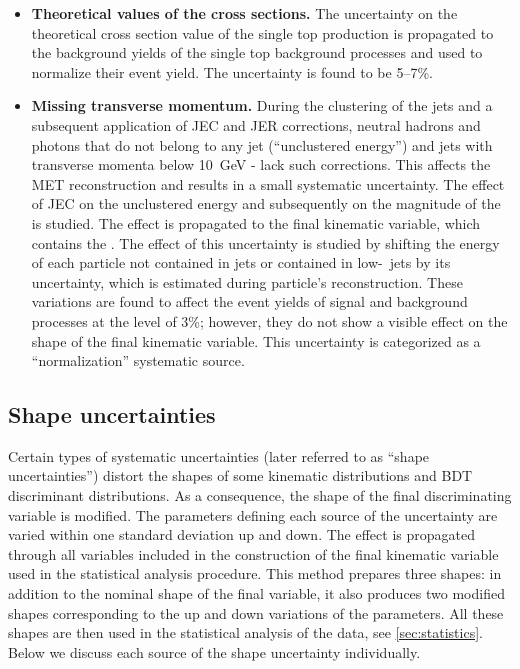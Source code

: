 \begin{itemize}
\item{\bf Theoretical values of the cross sections.} 
The uncertainty on the theoretical cross section value of the single top production is propagated to the background yields of the single top background processes and used to normalize their event yield. The uncertainty is found to be 5--7\%. 

\item{\bf Missing transverse momentum.} 
During the clustering of the jets and a subsequent application of JEC and JER corrections, 
neutral hadrons and photons that do not belong to any jet (``unclustered energy'') and jets with transverse momenta below 10~GeV - lack such corrections. This affects the MET reconstruction and results in a small systematic uncertainty. The effect of JEC on the unclustered energy and subsequently on the magnitude of the \PTslash is studied. The effect is propagated to the final kinematic variable, which contains the \PTslash. The effect of this uncertainty is studied by shifting the energy of each particle not contained in jets or contained in low-\pt~jets by its uncertainty, which is estimated during particle's reconstruction. These variations are found to affect the event yields of signal and background processes at the level of 3\%; however, they do not show a visible effect on the shape of the final kinematic variable. This uncertainty is categorized as a ``normalization'' systematic source.

\end{itemize}

\subsection{Shape uncertainties}
\label{sec:shapes}

Certain types of systematic uncertainties (later referred to as ``shape uncertainties'') distort the shapes of some 
kinematic distributions and BDT discriminant distributions. As a consequence, the shape of the final discriminating variable is modified. The parameters defining each source of the uncertainty are varied within one standard deviation up and down. The effect is propagated through all variables included in the construction of the final kinematic variable used in the statistical analysis procedure. This method prepares three shapes: in addition to the nominal shape of the final variable, it also produces two modified shapes corresponding to the up and down variations of the parameters. All these shapes are then used in the statistical analysis of the data, see \ref{sec:statistics}. Below we discuss each source of the shape uncertainty individually.

